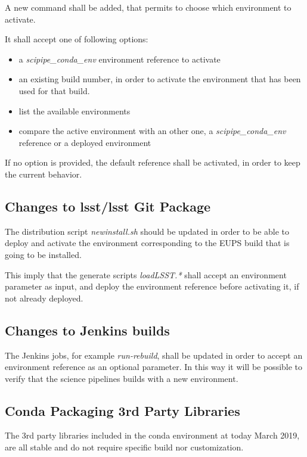 A new command shall be added, that permits to choose which environment to activate.

It shall accept one of following options:

\begin{itemize}
\item a \textit{scipipe\_conda\_env} environment reference to activate
\item an existing build number, in order to activate the environment that has been used for that build.
\item list the available environments
\item compare the active environment with an other one, a \textit{scipipe\_conda\_env} reference or a deployed environment
\end{itemize}

If no option is provided, the default reference shall be activated, in order to keep the current behavior.


\subsection{Changes to lsst/lsst Git Package} \label{sec:newinstall}

The distribution script \textit{newinstall.sh} should be updated in order to be able to deploy and activate the environment corresponding to the EUPS build that is going to be installed.

This imply that the generate scripts \textit{loadLSST.*} shall accept an environment parameter as input, and deploy the environment reference before activating it, if not already deployed.


\subsection{Changes to Jenkins builds} \label{sec:cibuilds}

The Jenkins jobs, for example \textit{run-rebuild}, shall be updated in order to accept an environment reference as an optional parameter.
In this way it will be possible to verify that the science pipelines builds with a new environment.


\subsection{Conda Packaging 3rd Party Libraries} \label{sec:3rdpkgs}

The 3rd party libraries included in the conda environment at today March 2019, are all stable and do not require specific build nor customization.

